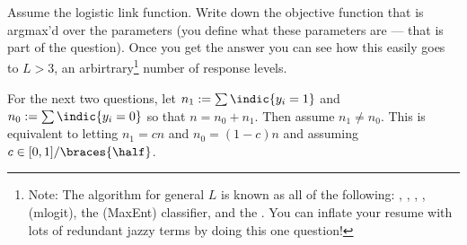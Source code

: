 \documentclass[12pt]{article}
\begin{document}
\begin{enumerate}
{Assume the logistic link function. Write down the objective function that is argmax'd over the parameters (you define what these parameters are --- that is part of the question). Once you get the answer you can see how this easily goes to $L > 3$, an arbirtrary\footnote{Note: The algorithm for general $L$ is known as all of the following: , , , ,  (mlogit), the  (MaxEnt) classifier, and the . You can inflate your resume with lots of redundant jazzy terms by doing this one question!} number of response levels.}\pagebreak

For the next two questions, let $n_1 := \sum \indic{y_i = 1}$ and $n_0 := \sum \indic{y_i = 0}$ so that $n = n_0 + n_1$. Then assume $n_1 \neq n_0$. This is equivalent to letting $n_1 = cn$ and $n_0 = (1-c)n$ and assuming $c \in [0,1]/\braces{\half}$.




\end{enumerate}


\end{document}
